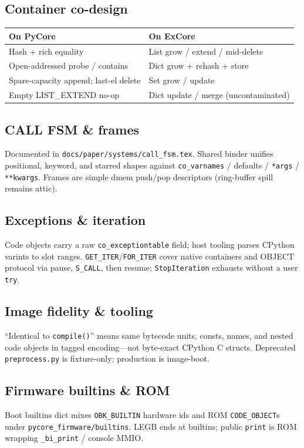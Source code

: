 \documentclass[11pt,a4paper]{article}
\begin{document}
\subsection{Container co-design}
\begin{center}
\small
\begin{tabular}{@{}ll@{}}
\toprule
On PyCore & On ExCore \\
\midrule
Hash + rich equality & List grow / extend / mid-delete \\
Open-addressed probe / contains & Dict grow + rehash + store \\
Spare-capacity append; last-el delete & Set grow / update \\
Empty LIST\_EXTEND no-op & Dict update / merge (uncontaminated) \\
\bottomrule
\end{tabular}
\end{center}

\subsection{CALL FSM \& frames}
Documented in \texttt{docs/paper/systems/call\_fsm.tex}.
Shared binder unifies positional, keyword, and starred shapes against
\texttt{co\_varnames} / defaults / \texttt{*args} / \texttt{**kwargs}.
Frames are simple dmem push/pop descriptors (ring-buffer spill remains attic).

\subsection{Exceptions \& iteration}
Code objects carry a raw \texttt{co\_exceptiontable} field; host tooling parses
CPython varints to slot ranges.
\texttt{GET\_ITER}/\texttt{FOR\_ITER} cover native containers and OBJECT
protocol via pause, \texttt{S\_CALL}, then resume; \texttt{StopIteration}
exhausts without a user \texttt{try}.

\subsection{Image fidelity \& tooling}
``Identical to \texttt{compile()}'' means same bytecode units, consts, names,
and nested code objects in tagged encoding---not byte-exact CPython C structs.
Deprecated \texttt{preprocess.py} is fixture-only; production is image-boot.

\subsection{Firmware builtins \& ROM}
Boot builtins dict mixes \texttt{OBK\_BUILTIN} hardware ids and ROM
\texttt{CODE\_OBJECT}s under \texttt{pycore\_firmware/builtins}.
LEGB ends at builtins; public \texttt{print} is ROM wrapping
\texttt{\_bi\_print} / console MMIO.
\end{document}
